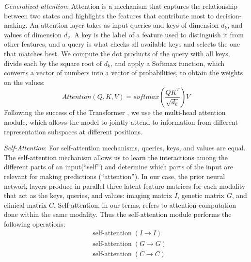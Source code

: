 \documentclass[11pt]{article}
\begin{document}
\textit{Generalized attention}: Attention is a mechanism that captures the relationship between two states and highlights the features that contribute most to decision-making. An attention layer takes as input queries and keys of dimension $d_k$, and values of dimension $d_v$. A key is the label of a feature used to distinguish it from other features, and a query is what checks all available keys and selects the one that matches best. We compute the dot products of the query with all keys, divide each by the square root of $d_k$, and apply a Softmax function, which converts a vector of numbers into a vector of probabilities, to obtain the weights on the values:
\begin{equation}
    Attention(Q, K, V) = softmax(\frac{QK^T}{ \sqrt{d_k}})V
\end{equation}
Following the success of the Transformer \cite{Vaswani2017AttentionIA}, we use the multi-head attention module, which allows the model to jointly attend to information from different representation subspaces at different positions. 


\textit{Self-Attention}: For self-attention mechanisms, queries, keys, and values are equal. The self-attention mechanism allows us to learn the interactions among the different parts of an input(``self'') and determine which parts of the input are relevant for making predictions (``attention''). In our case, the prior neural network layers produce in parallel three latent feature matrices for each modality that act as the keys, queries, and values: imaging matrix $I$, genetic matrix $G$, and clinical matrix $C$. Self-attention, in our terms, refers to attention computation done within the same modality. Thus the self-attention module performs the following operations:
\begin{align}
&\operatorname{self-attention}( I \rightarrow I)\\
&\operatorname{self-attention}( G \rightarrow G)\\
&\operatorname{self-attention}( C \rightarrow C)
\end{align}
  
\end{document}
